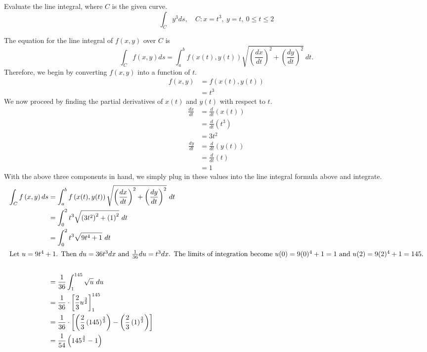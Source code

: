 \begin{exercise}
	Evaluate the line integral, where $C$ is the given curve.
	\begin{equation*}
	\int_C y^3 ds, \quad C:x=t^3, \ y=t, \ 0\leq t \leq 2
	\end{equation*}
\end{exercise}
\begin{solution}
	The equation for the line integral of $f\left(x,y\right)$ over $C$ is
	\begin{equation*}
	\int_C f\left(x,y\right) ds = \int_a^b f\left(x(t),y(t)\right) \sqrt{\left(\frac{dx}{dt}\right)^2 + \left(\frac{dy}{dt}\right)^2}\ dt.
	\end{equation*}
	Therefore, we begin by converting $f\left(x,y\right)$ into a function of $t$.
	\begin{align*}
	f\left(x,y\right) &= f\left(x(t),y(t)\right) \\
	&= t^3
	\end{align*}
	We now proceed by finding the partial derivatives of $x(t)$ and $y(t)$ with respect to $t$.
	\begin{align*}
	\frac{dx}{dt} &= \frac{d}{dt}\left(x(t)\right) \\
	&= \frac{d}{dt}\left(t^3\right) \\
	&= 3t^2
	\end{align*}
	\begin{align*}
	\frac{dy}{dt} &= \frac{d}{dt}\left(y(t)\right) \\
	&= \frac{d}{dt}\left(t\right) \\
	&= 1
	\end{align*}
	With the above three components in hand, we simply plug in these values into the line integral formula above and integrate.
	\begin{align*}
	\int_C f\left(x,y\right) ds &= \int_a^b f\left(x(t),y(t)\right)\sqrt{\left(\frac{dx}{dt}\right)^2+\left(\frac{dy}{dt}\right)^2}\ dt \\
	&= \int_0^2 t^3 \sqrt{\left(3t^2\right)^2 + \left(1\right)^2} \ dt \\
	&= \int_0^2 t^3 \sqrt{ 9t^4 + 1 }\ dt \\
	\intertext{Let $u = 9t^4 + 1$. Then $du = 36t^3dx$ and $\frac{1}{36}du = t^3dx$. The limits of integration become $u(0) = 9(0)^4+1 = 1$ and $u(2)=9(2)^4+1=145$.} \\
	&= \frac{1}{36} \int_{1}^{145} \sqrt{u} \ du \\
	&= \frac{1}{36} \cdot \left[ \frac{2}{3}u^{\frac{3}{2}} \right]_1^{145} \\
	&= \frac{1}{36} \cdot \left[ \left( \frac{2}{3}\left(145\right)^{\frac{3}{2}} \right) - \left( \frac{2}{3} \left(1\right)^{\frac{3}{2}} \right) \right] \\
	&= \frac{1}{54} \left( 145^{\frac{3}{2}} - 1 \right)
	\end{align*}
\end{solution}
